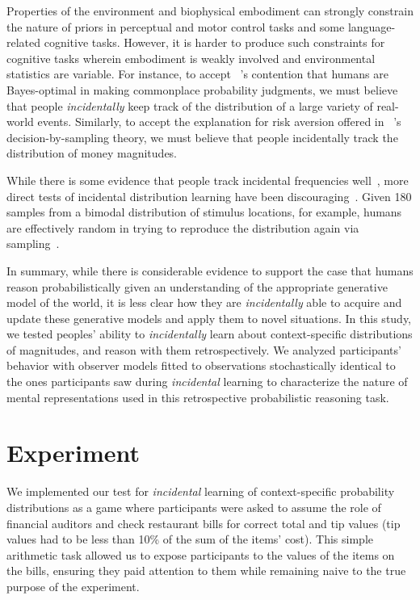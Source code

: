 \documentclass[10pt,letterpaper]{article}
\begin{document}
Properties of the environment and biophysical embodiment can strongly constrain the nature of priors in perceptual and motor control tasks and some language-related cognitive tasks. However, it is harder to produce such constraints for cognitive tasks wherein embodiment is weakly involved and environmental statistics are variable. For instance, to accept ~'s contention that humans are Bayes-optimal in making commonplace probability judgments, we must believe that people {\em incidentally} keep track of the distribution of a large variety of real-world events. Similarly, to accept the explanation for risk aversion offered in ~'s decision-by-sampling theory, we must believe that people incidentally track the distribution of money magnitudes. 

While there is some evidence that people track incidental frequencies well~\cite{hz84}, more direct tests of incidental distribution learning have been discouraging~\cite{sailor2005memory, tvp17}. Given 180 samples from a bimodal distribution of stimulus locations, for example, humans are effectively random in trying to reproduce the distribution again via sampling~\cite{tvp17}. 

In summary, while there is considerable evidence to support the case that humans reason probabilistically given an understanding of the appropriate generative model of the world, it is less clear how they are {\em incidentally} able to acquire and update these generative models and apply them to novel situations. In this study, we tested peoples' ability to {\em incidentally} learn about context-specific distributions of magnitudes, and reason with them retrospectively. We analyzed participants' behavior with observer models fitted to observations stochastically identical to the ones participants saw during {\em incidental} learning to characterize the nature of mental representations used in this retrospective probabilistic reasoning task.

\section{Experiment}


We implemented our test for {\em incidental} learning of context-specific probability distributions as a game where participants were asked to assume the role of financial auditors and check restaurant bills for correct total and tip values (tip values had to be less than 10\% of the sum of the items' cost). This simple arithmetic task allowed us to expose participants to the values of the items on the bills, ensuring they paid attention to them while remaining naive to the true purpose of the experiment. 
	
\end{document}
